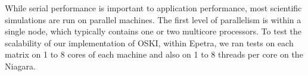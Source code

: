 While serial performance is important to application performance, most scientific simulations are
run on parallel machines.  The first level of parallelism is within a single node,
which typically contains one or two multicore processors.  To test the scalability of our
implementation of OSKI, within Epetra, we ran tests on each matrix on 1 to 8 cores of each machine
and also on 1 to 8 threads per core on the Niagara.

\begin{figure}[htbp]
\centering
{}
\end{figure}
